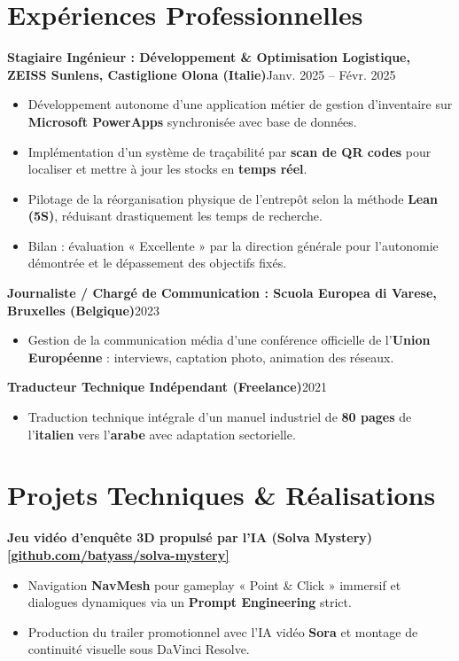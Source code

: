 \documentclass[10pt,a4paper]{article}
\newcommand{\entry}[2]{%
  \noindent\textbf{#1}\hfill{\small\textcolor{cvgrey}{#2}}\par\vspace{1pt}}
\newcommand{\projectentry}[1]{%
  \noindent\textbf{#1}\par\vspace{1pt}}
\begin{document}
\section{Expériences Professionnelles}

\entry{Stagiaire Ingénieur : Développement \& Optimisation Logistique, \textbf{ZEISS Sunlens}, Castiglione Olona (Italie)}{Janv. 2025 -- Févr. 2025}
\begin{itemize}
  \item Développement autonome d'une application métier de gestion d'inventaire sur \textbf{Microsoft PowerApps} synchronisée avec base de données.
  \item Implémentation d'un système de traçabilité par \textbf{scan de QR codes} pour localiser et mettre à jour les stocks en \textbf{temps réel}.
  \item Pilotage de la réorganisation physique de l'entrepôt selon la méthode \textbf{Lean (5S)}, réduisant drastiquement les temps de recherche.
  \item Bilan : évaluation « Excellente » par la direction générale pour l'autonomie démontrée et le dépassement des objectifs fixés.
\end{itemize}

\entry{Journaliste / Chargé de Communication : Scuola Europea di Varese, Bruxelles (Belgique)}{2023}
\begin{itemize}
  \item Gestion de la communication média d'une conférence officielle de l'\textbf{Union Européenne} : interviews, captation photo, animation des réseaux.
\end{itemize}

\entry{Traducteur Technique Indépendant (Freelance)}{2021}
\begin{itemize}
  \item Traduction technique intégrale d'un manuel industriel de \textbf{80 pages} de l'\textbf{italien} vers l'\textbf{arabe} avec adaptation sectorielle.
\end{itemize}

\section{Projets Techniques \& Réalisations}

\projectentry{Jeu vidéo d'enquête 3D propulsé par l'IA (Solva Mystery) \hfill \href{https://github.com/batyass/solva-mystery}{\small\textcolor{cvblue}{[github.com/batyass/solva-mystery]}}}
\par\vspace{1pt}
\begin{itemize}
  \item Navigation \textbf{NavMesh} pour gameplay « Point \& Click » immersif et dialogues dynamiques via un \textbf{Prompt Engineering} strict.
  \item Production du trailer promotionnel avec l'IA vidéo \textbf{Sora} et montage de continuité visuelle sous DaVinci Resolve.
\end{itemize}
\end{document}
